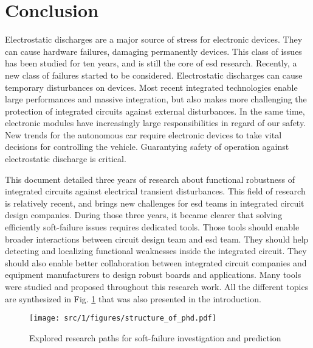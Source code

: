 \chapter*{Conclusion}
 
\label{sec:final-conclusion}

Electrostatic discharges are a major source of stress for electronic devices.
They can cause hardware failures, damaging permanently devices.
This class of issues has been studied for ten years, and is still the core of \gls{esd} research.
Recently, a new class of failures started to be considered.
Electrostatic discharges can cause temporary disturbances on devices.
Most recent integrated technologies enable large performances and massive integration, but also makes more challenging the protection of integrated circuits against external disturbances.
In the same time, electronic modules have increasingly large responsibilities in regard of our safety.
New trends for the autonomous car require electronic devices to take vital decisions for controlling the vehicle.
Guarantying safety of operation against electrostatic discharge is critical.

This document detailed three years of research about functional robustness of integrated circuits against electrical transient disturbances.
This field of research is relatively recent, and brings new challenges for \gls{esd} teams in integrated circuit design companies.
During those three years, it became clearer that solving efficiently soft-failure issues requires dedicated tools.
Those tools should enable broader interactions between circuit design team and \gls{esd} team.
They should help detecting and localizing functional weaknesses inside the integrated circuit.
They should also enable better collaboration between integrated circuit companies and equipment manufacturers to design robust boards and applications.
Many tools were studied and proposed throughout this research work.
All the different topics are synthesized in Fig. \ref{fig:phd-map-conclu} that was also presented in the introduction.

\begin{figure}[!h]
  \centering
  \texttt{[image: src/1/figures/structure\_of\_phd.pdf]}
  \caption{Explored research paths for soft-failure investigation and prediction}
  \label{fig:phd-map-conclu}
\end{figure}

